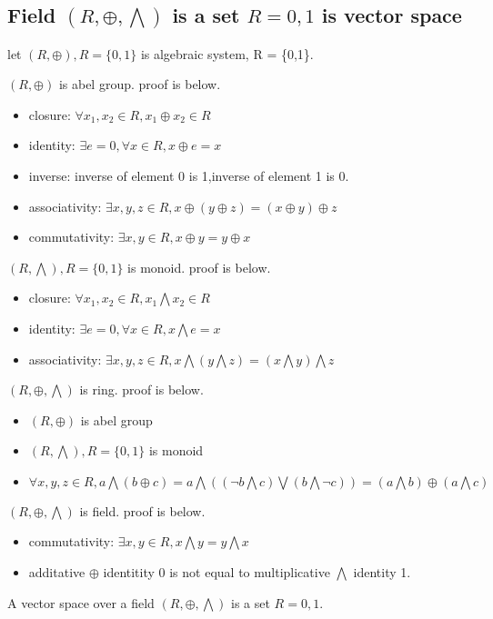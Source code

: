 \documentclass[10.5pt,onecolumn,twoside]{article}
\begin{document}
\begin{CJK*}{UTF8}{song}
\subsection{Field $(R, \oplus, \bigwedge )$  is a set $R={0,1}$ is vector space}
\label{subesc:vectorspace}
let $(R, \oplus ),R = \{ 0,1\}$ is  algebraic system, R = \{0,1\}.

$(R, \oplus )$ is abel group. proof is below.
\begin{itemize}
  \item closure: $\forall x_1,x_2\in R,x_1\oplus x_2\in R$
  \item identity: $\exists e=0,\forall x \in R,x\oplus e=x$
  \item inverse: inverse of element 0 is 1,inverse of element 1 is 0.
  \item associativity: $\exists x,y,z\in R,x\oplus(y\oplus z)=(x\oplus y)\oplus z$
  \item commutativity: $\exists x,y\in R,x\oplus y=y\oplus x$
\end{itemize}
$(R, \bigwedge ),R = \{ 0,1\}$ is monoid. proof is below.
\begin{itemize}
  \item closure: $\forall x_1,x_2\in R,x_1\bigwedge x_2\in R$
  \item identity: $\exists e=0,\forall x \in R,x\bigwedge e=x$
  \item associativity: $\exists x,y,z\in R,x\bigwedge(y\bigwedge z)=(x\bigwedge y)\bigwedge z$
\end{itemize}
$(R, \oplus, \bigwedge )$ is ring. proof is below.
\begin{itemize}
  \item $(R, \oplus )$ is abel group
  \item $(R, \bigwedge ),R = \{ 0,1\}$ is monoid
  \item $\forall x,y,z \in R,a\bigwedge(b\oplus c)=a\bigwedge((\neg b\bigwedge c)\bigvee(b\bigwedge \neg c))=(a\bigwedge b) \oplus (a\bigwedge c)$
\end{itemize}

$(R, \oplus, \bigwedge )$ is field. proof is below.
\begin{itemize}
  \item commutativity: $\exists x,y\in R,x\bigwedge y=y\bigwedge x$
  \item additative $\oplus$ identitity 0 is not equal to multiplicative $\bigwedge$ identity 1.
\end{itemize}

A vector space over a field $(R, \oplus, \bigwedge )$  is a set $R={0,1}$.


\end{CJK*}
\end{document}

